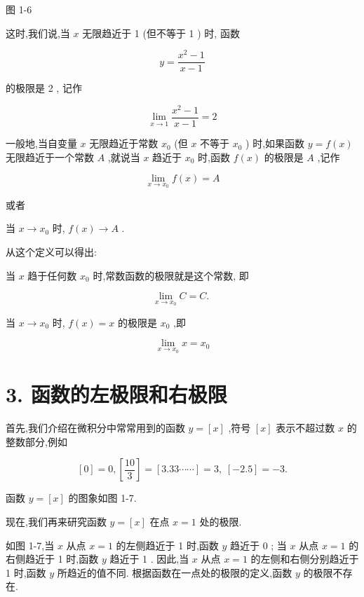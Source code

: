 \documentclass[10pt]{article}
\begin{document}
图 1-6

这时,我们说,当 \(x\) 无限趋近于 1 (但不等于 1 ) 时, 函数

\[
y = \frac{{x}^{2} - 1}{x - 1}
\]

的极限是 2 , 记作

\[
\mathop{\lim }\limits_{{x \rightarrow 1}}\frac{{x}^{2} - 1}{x - 1} = 2
\]

一般地,当自变量 \(x\) 无限趋近于常数 \({x}_{0}\) (但 \(x\) 不等于 \({x}_{0}\) ) 时,如果函数 \(y = f\left( x\right)\) 无限趋近于一个常数 \(A\) ,就说当 \(x\) 趋近于 \({x}_{0}\) 时,函数 \(f\left( x\right)\) 的极限是 \(A\) ,记作

\[
\mathop{\lim }\limits_{{x \rightarrow {x}_{0}}}f\left( x\right) = A
\]

或者

当 \(x \rightarrow {x}_{0}\) 时, \(f\left( x\right) \rightarrow A\) .

从这个定义可以得出:

当 \(x\) 趋于任何数 \({x}_{0}\) 时,常数函数的极限就是这个常数, 即

\[
\mathop{\lim }\limits_{{x \rightarrow {x}_{0}}}C = C\text{. }
\]

当 \(x \rightarrow {x}_{0}\) 时, \(f\left( x\right) = x\) 的极限是 \({x}_{0}\) ,即

\[
\mathop{\lim }\limits_{{x \rightarrow {x}_{0}}}x = {x}_{0}
\]

\section*{3. 函数的左极限和右极限}

首先,我们介绍在微积分中常常用到的函数 \(y = \left\lbrack x\right\rbrack\) ,符号 \(\left\lbrack x\right\rbrack\) 表示不超过数 \(x\) 的整数部分,例如

\[
\left\lbrack 0\right\rbrack = 0,\left\lbrack \frac{10}{3}\right\rbrack = \left\lbrack {{3.33}\cdots \cdots }\right\rbrack = 3,\;\left\lbrack {-{2.5}}\right\rbrack = - 3.
\]

函数 \(y = \left\lbrack x\right\rbrack\) 的图象如图 1-7.

现在,我们再来研究函数 \(y = \left\lbrack x\right\rbrack\) 在点 \(x = 1\) 处的极限.

如图 1-7,当 \(x\) 从点 \(x = 1\) 的左侧趋近于 1 时,函数 \(y\) 趋近于 0 ; 当 \(x\) 从点 \(x = 1\) 的右侧趋近于 1 时,函数 \(y\) 趋近于 1 . 因此,当 \(x\) 从点 \(x = 1\) 的左侧和右侧分别趋近于 1 时,函数 \(y\) 所趋近的值不同. 根据函数在一点处的极限的定义,函数 \(y\) 的极限不存在.
\end{document}

